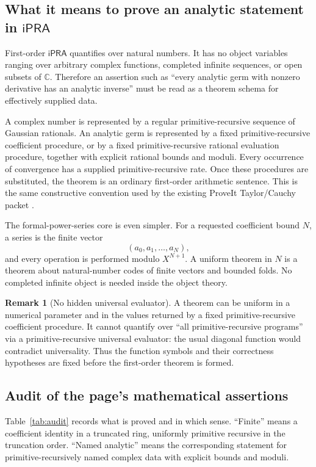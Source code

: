\documentclass[11pt]{article}
\theoremstyle{definition}
\newtheorem{remark}[theorem]{Remark}
\newcommand{\C}{\mathbb C}
\newcommand{\ipra}{\mathsf{iPRA}}
\begin{document}
\subsection{What it means to prove an analytic statement in \(\ipra\)}

First-order \(\ipra\) quantifies over natural numbers.  It has no object
variables ranging over arbitrary complex functions, completed infinite
sequences, or open subsets of \(\C\).  Therefore an assertion such as ``every
analytic germ with nonzero derivative has an analytic inverse'' must be read as
a theorem schema for effectively supplied data.

A complex number is represented by a regular primitive-recursive sequence of
Gaussian rationals.  An analytic germ is represented by a fixed
primitive-recursive coefficient procedure, or by a fixed primitive-recursive
rational evaluation procedure, together with explicit rational bounds and
moduli.  Every occurrence of convergence has a supplied primitive-recursive
rate.  Once these procedures are substituted, the theorem is an ordinary
first-order arithmetic sentence.  This is the same constructive convention
used by the existing ProveIt Taylor/Cauchy packet \cite{proveitTaylor}.

The formal-power-series core is even simpler.  For a requested coefficient
bound \(N\), a series is the finite vector
\[
 (a_0,a_1,\ldots,a_N),
\]
and every operation is performed modulo \(X^{N+1}\).  A uniform theorem in
\(N\) is a theorem about natural-number codes of finite vectors and bounded
folds.  No completed infinite object is needed inside the object theory.

\begin{remark}[No hidden universal evaluator]
A theorem can be uniform in a numerical parameter and in the values returned
by a fixed primitive-recursive coefficient procedure.  It cannot quantify over
``all primitive-recursive programs'' via a primitive-recursive universal
evaluator: the usual diagonal function would contradict universality.  Thus the
function symbols and their correctness hypotheses are fixed before the
first-order theorem is formed.
\end{remark}

\subsection{Audit of the page's mathematical assertions}

Table~\ref{tab:audit} records what is proved and in which sense.  ``Finite''
means a coefficient identity in a truncated ring, uniformly primitive
recursive in the truncation order.  ``Named analytic'' means the corresponding
statement for primitive-recursively named complex data with explicit bounds and
moduli.
\end{document}
